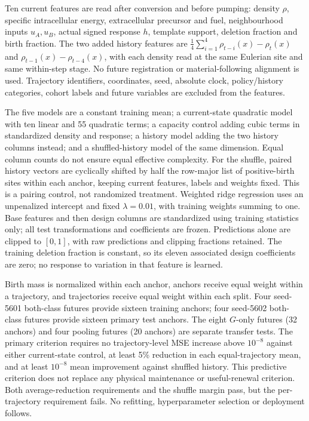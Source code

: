 Ten current features are read after conversion and before pumping: density $\rho$, specific intracellular energy, extracellular precursor and fuel, neighbourhood inputs $u_A,u_B$, actual signed response $h$, template support, deletion fraction and birth fraction. The two added history features are $\frac14\sum_{i=1}^4\rho_{t-i}(x)-\rho_t(x)$ and $\rho_{t-1}(x)-\rho_{t-4}(x)$, with each density read at the same Eulerian site and same within-step stage. No future registration or material-following alignment is used. Trajectory identifiers, coordinates, seed, absolute clock, policy/history categories, cohort labels and future variables are excluded from the features.

The five models are a constant training mean; a current-state quadratic model with ten linear and 55 quadratic terms; a capacity control adding cubic terms in standardized density and response; a history model adding the two history columns instead; and a shuffled-history model of the same dimension. Equal column counts do not ensure equal effective complexity. For the shuffle, paired history vectors are cyclically shifted by half the row-major list of positive-birth sites within each anchor, keeping current features, labels and weights fixed. This is a pairing control, not randomized treatment. Weighted ridge regression uses an unpenalized intercept and fixed $\lambda=0.01$, with training weights summing to one. Base features and then design columns are standardized using training statistics only; all test transformations and coefficients are frozen. Predictions alone are clipped to $[0,1]$, with raw predictions and clipping fractions retained. The training deletion fraction is constant, so its eleven associated design coefficients are zero; no response to variation in that feature is learned.

Birth mass is normalized within each anchor, anchors receive equal weight within a trajectory, and trajectories receive equal weight within each split. Four seed-5601 both-class futures provide sixteen training anchors; four seed-5602 both-class futures provide sixteen primary test anchors. The eight $G$-only futures (32 anchors) and four pooling futures (20 anchors) are separate transfer tests. The primary criterion requires no trajectory-level MSE increase above $10^{-8}$ against either current-state control, at least 5\% reduction in each equal-trajectory mean, and at least $10^{-8}$ mean improvement against shuffled history. This predictive criterion does not replace any physical maintenance or useful-renewal criterion. Both average-reduction requirements and the shuffle margin pass, but the per-trajectory requirement fails. No refitting, hyperparameter selection or deployment follows.

